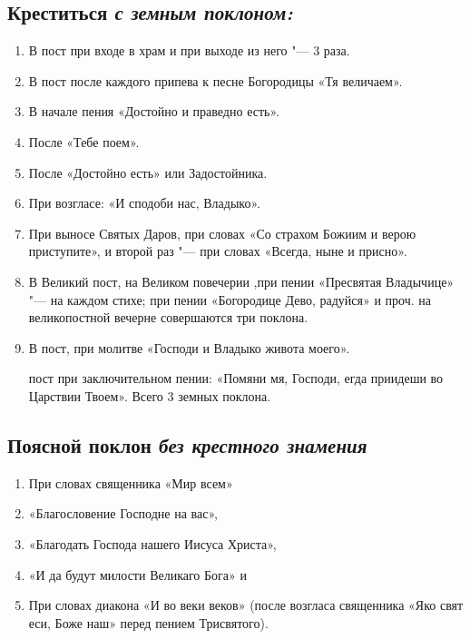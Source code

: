 \subsection*{Креститься \itshape с земным поклоном:}

\begin{enumerate}
\item В пост при входе в храм и при выходе из него "--- 3 раза. 

\item В пост после каждого припева к песне Богородицы «Тя величаем». 

\item В начале пения «Достойно и праведно есть». 

\item После «Тебе поем». 

\item После «Достойно есть» или Задостойника. 

\item При возгласе: «И сподоби нас, Владыко». 

\item При выносе Святых Даров, при словах «Со страхом Божиим и верою приступите», и второй раз "--- при словах «Всегда, ныне и присно». 

\item В Великий пост, на Великом повечерии ,при пении «Пресвятая Владычице» "--- на каждом стихе; при пении «Богородице Дево, радуйся» и проч. на великопостной вечерне совершаются три поклона. 

\item В пост, при молитве «Господи и Владыко живота моего». 

 пост при заключительном пении: «Помяни мя, Господи, егда приидеши во Царствии Твоем». Всего 3 земных поклона.

\end{enumerate}




\subsection*{Поясной поклон \itshape без крестного знамения}

\begin{enumerate}

\item При словах священника «Мир всем»

\item «Благословение Господне на вас»,

\item «Благодать Господа нашего Иисуса Христа», 

\item «И да будут милости Великаго Бога» и

\item При словах диакона «И во веки веков» (после возгласа священника «Яко свят еси, Боже наш» перед пением Трисвятого). 


\end{enumerate}





